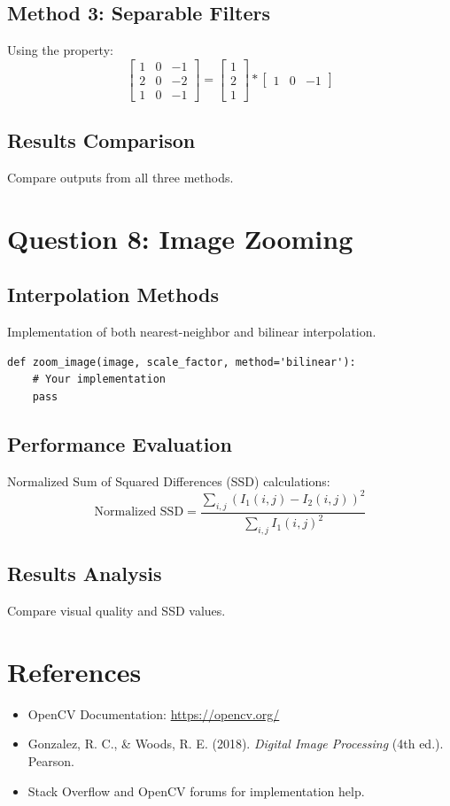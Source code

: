 \documentclass[12pt]{article}
\begin{document}
\subsection{Method 3: Separable Filters}
Using the property:
\[
\begin{bmatrix} 1 & 0 & -1 \\ 2 & 0 & -2 \\ 1 & 0 & -1 \end{bmatrix} 
= \begin{bmatrix} 1 \\ 2 \\ 1 \end{bmatrix} * \begin{bmatrix} 1 & 0 & -1 \end{bmatrix}
\]

\subsection{Results Comparison}
Compare outputs from all three methods.

\section{Question 8: Image Zooming}
\subsection{Interpolation Methods}
Implementation of both nearest-neighbor and bilinear interpolation.

\begin{lstlisting}
def zoom_image(image, scale_factor, method='bilinear'):
    # Your implementation
    pass
\end{lstlisting}

\subsection{Performance Evaluation}
Normalized Sum of Squared Differences (SSD) calculations:
\[
\text{Normalized SSD} = \frac{\sum_{i,j}(I_1(i,j) - I_2(i,j))^2}{\sum_{i,j}I_1(i,j)^2}
\]

\subsection{Results Analysis}
Compare visual quality and SSD values.

\section{References}
\begin{itemize}
    \item OpenCV Documentation: \url{https://opencv.org/}
    \item Gonzalez, R. C., \& Woods, R. E. (2018). \textit{Digital Image Processing} (4th ed.). Pearson.
    \item Stack Overflow and OpenCV forums for implementation help.
\end{itemize}



% 
% 
\end{document}
